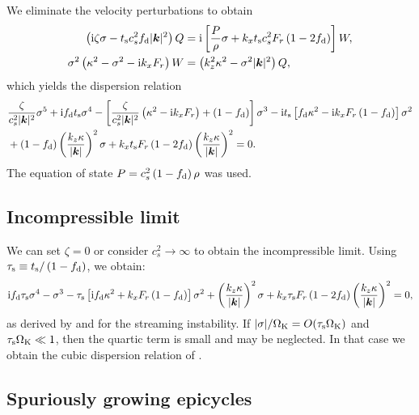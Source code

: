 We eliminate the velocity perturbations to obtain
\begin{align}
  \left(\mathrm{i} \zeta \sigma - t_\mathrm{s} c_s^2 f_\mathrm{d} |\bm{k}|^2\right)Q &=
  \mathrm{i} \left[
  \frac{P}{\rho}\sigma + k_xt_\mathrm{s} c_s^2 F_r\left(1 -
  2f_\mathrm{d}\right)\right]W, \\
   \sigma^2 \left( \kappa^2 - \sigma^2 - \mathrm{i} k_x F_r\right)W &=
    \left(k_z^2\kappa^2 - \sigma^2|\bm{k}|^2\right)Q, 
\end{align}
which yields the dispersion relation
\begin{align}
  &\frac{\zeta}{c_s^2|\bm{k}|^2}\sigma^5 + \mathrm{i} f_\mathrm{d} t_\mathrm{s}
  \sigma^4 - \left[ \frac{\zeta}{c_s^2|\bm{k}|^2} \left(\kappa^2 - \mathrm{i}
  k_x F_r\right) + \left(1 - f_\mathrm{d}\right)\right]\sigma^3 - \mathrm{i}
  t_\mathrm{s} \left[f_\mathrm{d} \kappa^2 - \mathrm{i} k_x F_r\left( 1 -
  f_\mathrm{d}\right)\right]\sigma^2 \notag\\ 
  &+ \left(1 -
  f_\mathrm{d}\right)\left(\frac{k_z\kappa}{|\bm{k}|}\right)^2\sigma +
  k_x t_\mathrm{s} F_r\left(1 - 2f_\mathrm{d}\right)
  \left(\frac{k_z\kappa}{|\bm{k}|}\right)^2  = 0.\label{streaming_dispersion}
\end{align}
The equation of state $P = c_s^2\left( 1 - f_\mathrm{d}\right)\rho$
was used.


\subsection{Incompressible limit}

 We can set $\zeta = 0$ or consider $c_s^2\to \infty$ to
obtain the incompressible limit. Using $\tau_\mathrm{s} \equiv
t_\mathrm{s}/\left(1 - f_\mathrm{d}\right)$, we obtain: 
\begin{align}
\mathrm{i} f_\mathrm{d} \tau_\mathrm{s}
  \sigma^4 - \sigma^3 - 
  \tau_\mathrm{s} \left[ \mathrm{i} f_\mathrm{d} \kappa^2 + k_x F_r\left( 1 -
  f_\mathrm{d}\right)\right]\sigma^2 
  + \left(\frac{k_z\kappa}{|\bm{k}|}\right)^2\sigma + 
  k_x \tau_\mathrm{s} F_r\left(1 - 2f_\mathrm{d}\right)
  \left(\frac{k_z\kappa}{|\bm{k}|}\right)^2  = 0,\label{streaming_incompressible}
\end{align}
as derived by \cite{jacquet11} and \cite{laibe14} for the streaming
instability. 
If $|\sigma|/\Omega_{\rm K} = O(\tau_\mathrm{s}\Omega_{\rm K})$ and
$\tau_\mathrm{s}\Omega_{\rm K}\ll 1$, then the quartic term
is small and may be neglected. In that case we obtain the cubic
dispersion relation of \citet{youdin05a}. 

\subsection{Spuriously growing epicycles}

